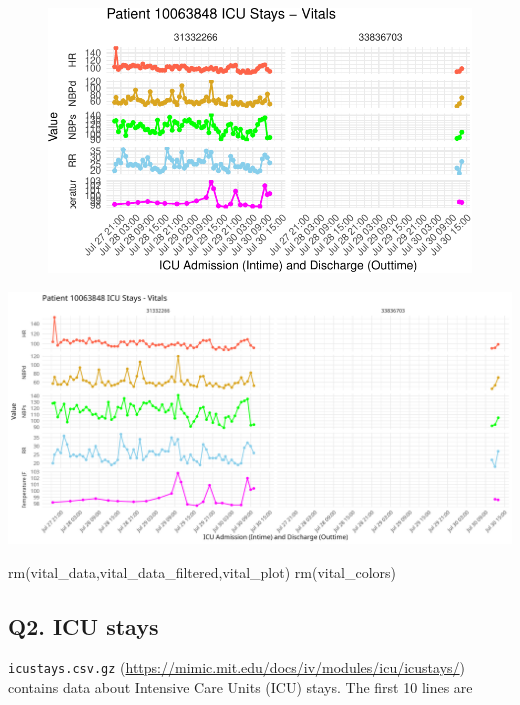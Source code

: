 \documentclass[
]{article}
\newenvironment{Shaded}{\begin{snugshade}}{\end{snugshade}}
\newcommand{\FunctionTok}[1]{\textcolor[rgb]{0.00,0.00,0.00}{#1}}
\newcommand{\NormalTok}[1]{\textcolor[rgb]{0.00,0.00,0.00}{#1}}
\begin{document}
\begin{figure}[H]

{\centering \includegraphics{hw3_files/figure-pdf/unnamed-chunk-15-1.pdf}

}

\end{figure}

\includegraphics{images/clipboard-3743216497.png}

\begin{Shaded}
\begin{Highlighting}[]
\FunctionTok{rm}\NormalTok{(vital\_data,vital\_data\_filtered,vital\_plot)}
\FunctionTok{rm}\NormalTok{(vital\_colors)}
\end{Highlighting}
\end{Shaded}

\hypertarget{q2.-icu-stays}{%
\subsection{Q2. ICU stays}\label{q2.-icu-stays}}

\texttt{icustays.csv.gz}
(\url{https://mimic.mit.edu/docs/iv/modules/icu/icustays/}) contains
data about Intensive Care Units (ICU) stays. The first 10 lines are
\end{document}

